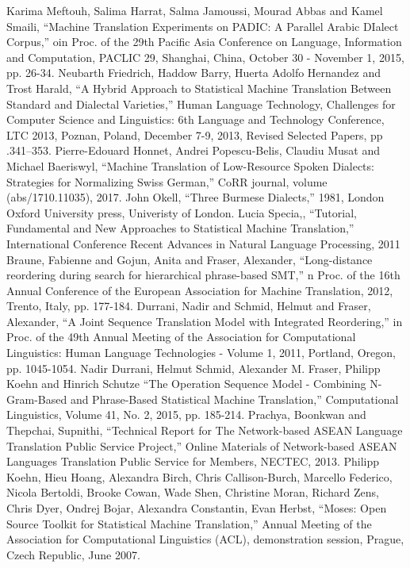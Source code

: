 \documentclass[conference]{IEEEtran}
\begin{document}
\begin{thebibliography}{00}
 Karima Meftouh, Salima Harrat, Salma Jamoussi, Mourad Abbas and Kamel Smaili, ``Machine Translation Experiments on PADIC: A Parallel Arabic DIalect Corpus,'' oin Proc. of the 29th Pacific Asia Conference on Language, Information and Computation, PACLIC 29, Shanghai, China, October 30 - November 1, 2015, pp. 26-34.
 Neubarth Friedrich, Haddow Barry, Huerta Adolfo Hernandez and Trost Harald, ``A Hybrid Approach to Statistical Machine Translation Between Standard and Dialectal Varieties,'' Human Language Technology, Challenges for Computer Science and Linguistics: 6th Language and Technology Conference, LTC 2013, Poznan, Poland, December 7-9, 2013, Revised Selected Papers, pp .341–353.
 Pierre-Edouard Honnet, Andrei Popescu-Belis, Claudiu Musat and Michael Baeriswyl, ``Machine Translation of Low-Resource Spoken Dialects: Strategies for Normalizing Swiss German,'' CoRR journal, volume (abs/1710.11035), 2017.
 John Okell, ``Three Burmese  Dialects,'' 1981, London Oxford University press, Univeristy of London.
 Lucia Specia,, ``Tutorial, Fundamental and New Approaches to Statistical Machine Translation,'' International Conference Recent Advances in Natural Language Processing, 2011
 Braune, Fabienne and Gojun, Anita and Fraser, Alexander, ``Long-distance reordering during search for hierarchical phrase-based SMT,'' n Proc. of the 16th Annual Conference of the European Association for Machine Translation, 2012, Trento, Italy, pp. 177-184.
 Durrani, Nadir and Schmid, Helmut and Fraser, Alexander, ``A Joint Sequence Translation Model with Integrated Reordering,'' in Proc. of the 49th Annual Meeting of the Association for Computational Linguistics: Human Language Technologies - Volume 1, 2011, Portland, Oregon, pp. 1045-1054.
 Nadir Durrani, Helmut Schmid, Alexander M. Fraser, Philipp Koehn and Hinrich Schutze ``The Operation Sequence Model - Combining N-Gram-Based and Phrase-Based Statistical Machine Translation,'' Computational Linguistics, Volume 41, No. 2, 2015, pp. 185-214.
 Prachya, Boonkwan and Thepchai, Supnithi, ``Technical Report for The Network-based ASEAN Language Translation Public Service Project,'' Online Materials of Network-based ASEAN Languages Translation Public Service for Members, NECTEC, 2013.
 Philipp Koehn, Hieu Hoang, Alexandra Birch, Chris Callison-Burch, Marcello Federico, Nicola Bertoldi, Brooke Cowan, Wade Shen, Christine Moran, Richard Zens, Chris Dyer, Ondrej Bojar, Alexandra Constantin, Evan Herbst, ``Moses: Open Source Toolkit for Statistical Machine Translation,'' Annual Meeting of the Association for Computational Linguistics (ACL), demonstration session, Prague, Czech Republic, June 2007.

\end{thebibliography}
\end{document}

